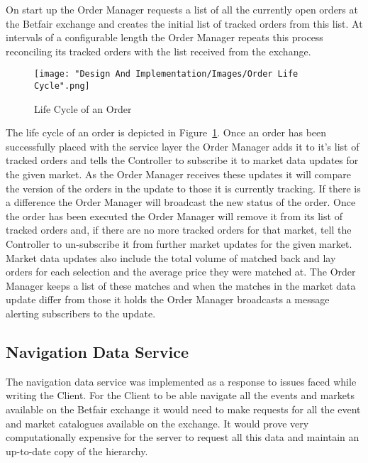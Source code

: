 		On start up the Order Manager requests a list of all the currently open orders at the Betfair exchange and creates the initial list of tracked orders from this list. At intervals of a configurable length the Order Manager repeats this process reconciling its tracked orders with the list received from the exchange.
		
			\begin{figure}[H]
				\texttt{[image: "Design And Implementation/Images/Order Life Cycle".png]}
				\centering
				\caption{Life Cycle of an Order}
    				\label{fig:orderLifeCycle}
			\end{figure}			
		
		The life cycle of an order is depicted in Figure~\ref{fig:orderLifeCycle}. Once an order has been successfully placed with the service layer the Order Manager adds it to it's list of tracked orders and tells the Controller to subscribe it to market data updates for the given market. As the Order Manager receives these updates it will compare the version of the orders in the update to those it is currently tracking. If there is a difference the Order Manager will broadcast the new status of the order. Once the order has been executed the Order Manager will remove it from its list of tracked orders and, if there are no more tracked orders for that market, tell the Controller to un-subscribe it from further market updates for the given market.\\
		
		Market data updates also include the total volume of matched back and lay orders for each selection and the average price they were matched at. The Order Manager keeps a list of these matches and when the matches in the market data update differ from those it holds the Order Manager broadcasts a message alerting subscribers to the update.
		
		
	\subsection{Navigation Data Service}
		The navigation data service was implemented as a response to issues faced while writing the Client. For the Client to be able navigate all the events and markets available on the Betfair exchange it would need to make requests for all the event and market catalogues available on the exchange. It would prove very computationally expensive for the server to request all this data and maintain an up-to-date copy of the hierarchy.\\
		
